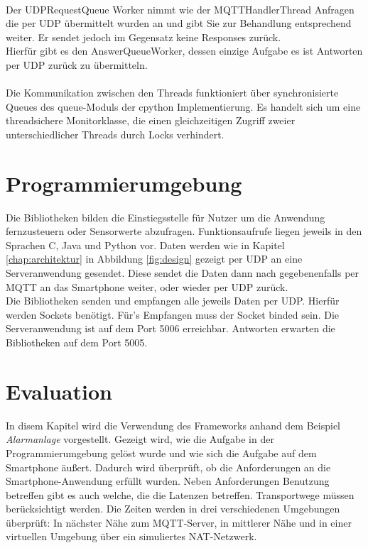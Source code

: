 \documentclass[11pt,a4paper]{report}
\begin{document}
\\
Der UDPRequestQueue Worker nimmt wie der MQTTHandlerThread Anfragen die per UDP übermittelt wurden an und gibt Sie zur Behandlung entsprechend weiter.
Er sendet jedoch im Gegensatz keine Responses zurück.
\\
Hierfür gibt es den AnswerQueueWorker, dessen einzige Aufgabe es ist Antworten per UDP zurück zu übermitteln.
\\\\
Die Kommunikation zwischen den Threads funktioniert über synchronisierte Queues des queue-Moduls\cite{python_queue} der cpython Implementierung.
Es handelt sich um eine threadsichere Monitorklasse, die einen gleichzeitigen Zugriff zweier unterschiedlicher Threads durch Locks verhindert.

\chapter{Programmierumgebung}\label{chap:libs}
Die Bibliotheken bilden die Einstiegsstelle für Nutzer um die Anwendung fernzusteuern oder Sensorwerte abzufragen.
Funktionsaufrufe liegen jeweils in den Sprachen C, Java und Python vor.
Daten werden wie in Kapitel \ref{chap:architektur} in Abbildung \ref{fig:design} gezeigt per UDP an eine Serveranwendung gesendet.
Diese sendet die Daten dann nach gegebenenfalls per MQTT an das Smartphone weiter, oder wieder per UDP zurück.
\\
Die Bibliotheken senden und empfangen alle jeweils Daten per UDP.
Hierfür werden Sockets benötigt.
Für's Empfangen muss der Socket binded sein.
Die Serveranwendung ist auf dem Port 5006 erreichbar.
Antworten erwarten die Bibliotheken auf dem Port 5005.

\chapter{Evaluation}\label{chap:eval}
In disem Kapitel wird die Verwendung des Frameworks anhand dem Beispiel \textit{Alarmanlage} vorgestellt.
Gezeigt wird, wie die Aufgabe in der Programmierumgebung gelöst wurde und wie sich die Aufgabe auf dem Smartphone äußert.
Dadurch wird überprüft, ob die Anforderungen an die Smartphone-Anwendung erfüllt wurden.
Neben Anforderungen Benutzung betreffen gibt es auch welche, die die Latenzen betreffen.
Transportwege müssen berücksichtigt werden.
Die Zeiten werden in drei verschiedenen Umgebungen überprüft: In nächster Nähe zum MQTT-Server, in mittlerer Nähe und in einer virtuellen Umgebung über ein simuliertes NAT-Netzwerk.
\end{document}

